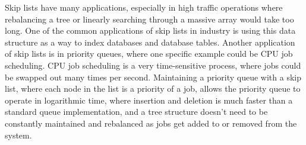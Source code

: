 \documentclass{article}
\begin{document}
Skip lists have many applications, especially in high traffic operations where rebalancing a tree or linearly searching through a massive array would take too long. One of the common applications of skip lists in industry is using this data structure as a way to index databases and database tables. Another application of skip lists is in priority queues, where one specific example could be CPU job scheduling. CPU job scheduling is a very time-sensitive process, where jobs could be swapped out many times per second. Maintaining a priority queue with a skip list, where each node in the list is a priority of a job, allows the priority queue to operate in logarithmic time, where insertion and deletion is much faster than a standard queue implementation, and a tree structure doesn’t need to be constantly maintained and rebalanced as jobs get added to or removed from the system.



\pagebreak
\end{document}
